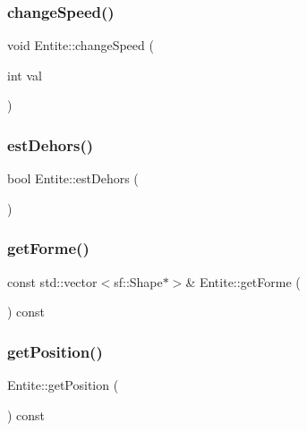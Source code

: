 \subsubsection{\texorpdfstring{change\+Speed()}{changeSpeed()}}
{\footnotesize\ttfamily void Entite\+::change\+Speed (\begin{DoxyParamCaption}\item[{int}]{val }\end{DoxyParamCaption})}

\mbox{\label{class_entite_a4d38790ebb4bf082e20e47355a7b2f0c}} 
\subsubsection{\texorpdfstring{est\+Dehors()}{estDehors()}}
{\footnotesize\ttfamily bool Entite\+::est\+Dehors (\begin{DoxyParamCaption}{ }\end{DoxyParamCaption})}

\mbox{\label{class_entite_a0fccfa39c6be09c5ea63fb999fef4c8e}} 
\subsubsection{\texorpdfstring{get\+Forme()}{getForme()}}
{\footnotesize\ttfamily const std\+::vector$<$sf\+::\+Shape$\ast$$>$\& Entite\+::get\+Forme (\begin{DoxyParamCaption}{ }\end{DoxyParamCaption}) const\hspace{0.3cm}{\ttfamily [inline]}}

\mbox{\label{class_entite_a6f6fd1e1f9f6ad44f0ecc74961a774d9}} 
\subsubsection{\texorpdfstring{get\+Position()}{getPosition()}}
{\footnotesize\ttfamily Entite\+::get\+Position (\begin{DoxyParamCaption}{ }\end{DoxyParamCaption}) const}



